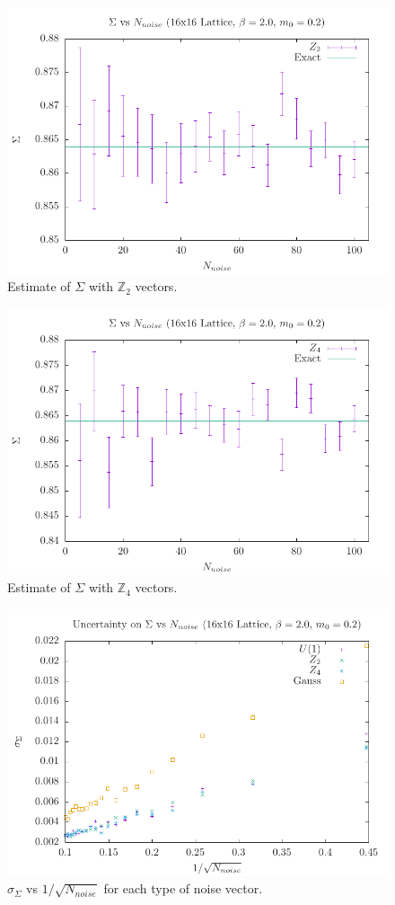 \newpage
\begin{figure}[H]
\centering
              \includegraphics[width=0.8\linewidth]{images/cc_z2.pdf}
              \caption{Estimate of $\Sigma$ with $\mathbb{Z}_2$ vectors.}
              \label{fig:cc_z2}
\end{figure}
\begin{figure}[H]
\centering
              \includegraphics[width=0.8\linewidth]{images/cc_z4.pdf}
              \caption{Estimate of $\Sigma$ with $\mathbb{Z}_4$ vectors.}
              \label{fig:cc_z4}
\end{figure}
\begin{figure}[H]
    \centering
    \includegraphics[width=0.8\linewidth]{images/noise_errors.pdf}
    \caption{$\sigma_\Sigma$ vs $1/\sqrt{N_{noise}}$ for each type of noise vector.}
    \label{fig:noise_errors}
\end{figure}
